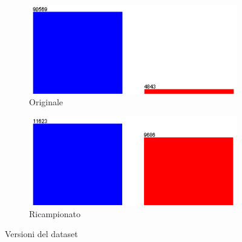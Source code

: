 \begin{figure}[htbp!]
	\begin{subfigure}{.5\textwidth}
		\centering
		\includegraphics[width=.8\linewidth]{./images/full_unbiased2}
		\caption{Originale}
		\label{fig:unbiased}
	\end{subfigure}
	\begin{subfigure}{.5\textwidth}
		\centering
		\includegraphics[width=.8\linewidth]{./images/subsampled}
		\caption{Ricampionato}
		\label{fig:sampled}
	\end{subfigure}
	\caption{Versioni del dataset}	
	\label{fig:dataset}
\end{figure}

\pagebreak

